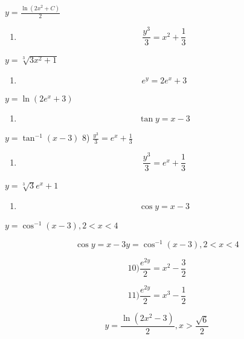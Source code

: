 \documentclass[
]{article}
\providecommand{\tightlist}{%
  \setlength{\itemsep}{0pt}\setlength{\parskip}{0pt}}
\begin{document}
\(y = \frac{\ln(2x^2 + C)}{2}\)

\begin{enumerate}
\def\labelenumi{\arabic{enumi})}
\setcounter{enumi}{4}
\tightlist
\item
  \[\frac{y^3}{3} = x^2 + \frac{1}{3}\]
\end{enumerate}

\(y = \sqrt[3]{3x^2 + 1}\)

\begin{enumerate}
\def\labelenumi{\arabic{enumi})}
\setcounter{enumi}{5}
\tightlist
\item
  \[e^y = 2e^x + 3\]
\end{enumerate}

\(y = \ln (2e^x + 3)\)

\begin{enumerate}
\def\labelenumi{\arabic{enumi})}
\setcounter{enumi}{6}
\tightlist
\item
  \[\tan y = x - 3\]
\end{enumerate}

\(y = \tan^{-1}(x - 3)\) 8) \(\frac{y^3}{3} = e^x + \frac{1}{3}\)

\begin{enumerate}
\def\labelenumi{\arabic{enumi})}
\setcounter{enumi}{7}
\tightlist
\item
  \[\frac{y^3}{3} = e^x + \frac{1}{3}\]
\end{enumerate}

\(y = \sqrt[3]{3}e^x + 1\)

\begin{enumerate}
\def\labelenumi{\arabic{enumi})}
\setcounter{enumi}{8}
\tightlist
\item
  \[\cos y = x - 3\]
\end{enumerate}

\(y = \cos^{-1}(x - 3), 2 < x < 4\)

\[\cos y = x - 3 y = \cos^{-1}(x - 3), 2 < x < 4\]

\[10) \frac{e^{2y}}{2} = x^2 - \frac{3}{2}\]

\[11) \frac{e^{2y}}{2} = x^3 - \frac{1}{2}\]

\[y = \frac{\ln(2x^2 - 3)}{2}, x > \frac{\sqrt{6}}{2}\]
\end{document}

